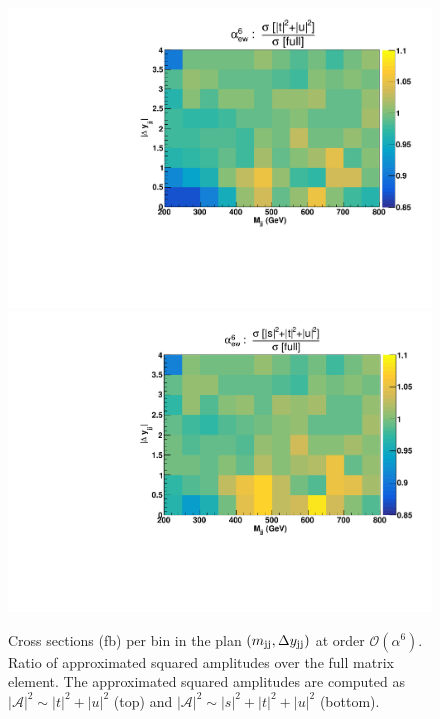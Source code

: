 \begin{figure}[hbt]
\centering
\includegraphics[scale=0.395]{figures/scanfigures/ratio_tu.pdf}
\includegraphics[scale=0.395]{figures/scanfigures/ratio_stu.pdf}
\caption{Cross sections (fb) per bin in the plan $\left(m_{\text{j}\text{j}}, \Delta y_{\text{j}\text{j}}\right)$ at order $\mathcal{O}(\alpha^6)$.
Ratio of approximated squared amplitudes over the full matrix element. The approximated squared amplitudes are computed as $|\mathcal{A}|^2 \sim |t|^2 + |u|^2$ (top) and $|\mathcal{A}|^2 \sim |s|^2 + |t|^2 + |u|^2$ (bottom).}
\label{fig:ratio2d_LO}
\end{figure}
